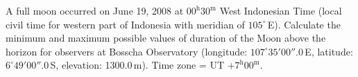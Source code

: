 A full moon occurred on June 19, 2008 at $00^{\mathrm{h}}30^{\mathrm{m}}$ West
Indonesian Time (local civil time for western part of Indonesia with meridian
of $105^\circ$\,E). Calculate the minimum and maximum possible values of
duration of the Moon above the horizon for observers at Bosscha Observatory
(longitude: $107^\circ 35' 00''\!.0$\,E, latitude: $6^\circ 49' 00''\!.0$\,S,
elevation: 1300.0\,m). Time zone = UT $+7^{\mathrm{h}}00^{\mathrm{m}}$.
